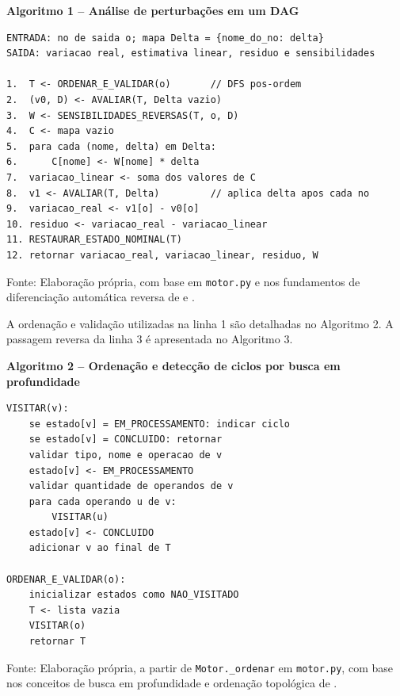 \documentclass[12pt,openright,oneside,a4paper,brazil]{abntex2}
\begin{document}
\begin{center}
\begin{minipage}{0.96\textwidth}
\small
\textbf{Algoritmo 1 -- Análise de perturbações em um DAG}\par
\begin{verbatim}
ENTRADA: no de saida o; mapa Delta = {nome_do_no: delta}
SAIDA: variacao real, estimativa linear, residuo e sensibilidades

1.  T <- ORDENAR_E_VALIDAR(o)       // DFS pos-ordem
2.  (v0, D) <- AVALIAR(T, Delta vazio)
3.  W <- SENSIBILIDADES_REVERSAS(T, o, D)
4.  C <- mapa vazio
5.  para cada (nome, delta) em Delta:
6.      C[nome] <- W[nome] * delta
7.  variacao_linear <- soma dos valores de C
8.  v1 <- AVALIAR(T, Delta)         // aplica delta apos cada no
9.  variacao_real <- v1[o] - v0[o]
10. residuo <- variacao_real - variacao_linear
11. RESTAURAR_ESTADO_NOMINAL(T)
12. retornar variacao_real, variacao_linear, residuo, W
\end{verbatim}
\end{minipage}
\end{center}
{\footnotesize Fonte: Elaboração própria, com base em \texttt{motor.py} e nos fundamentos de diferenciação automática reversa de  e .}\par

A ordenação e validação utilizadas na linha 1 são detalhadas no Algoritmo 2. A passagem reversa da linha 3 é apresentada no Algoritmo 3.

\begin{center}
\begin{minipage}{0.96\textwidth}
\small
\textbf{Algoritmo 2 -- Ordenação e detecção de ciclos por busca em profundidade}\par
\begin{verbatim}
VISITAR(v):
    se estado[v] = EM_PROCESSAMENTO: indicar ciclo
    se estado[v] = CONCLUIDO: retornar
    validar tipo, nome e operacao de v
    estado[v] <- EM_PROCESSAMENTO
    validar quantidade de operandos de v
    para cada operando u de v:
        VISITAR(u)
    estado[v] <- CONCLUIDO
    adicionar v ao final de T

ORDENAR_E_VALIDAR(o):
    inicializar estados como NAO_VISITADO
    T <- lista vazia
    VISITAR(o)
    retornar T
\end{verbatim}
\end{minipage}
\end{center}
{\footnotesize Fonte: Elaboração própria, a partir de \texttt{Motor.\_ordenar} em \texttt{motor.py}, com base nos conceitos de busca em profundidade e ordenação topológica de .}\par
\end{document}
